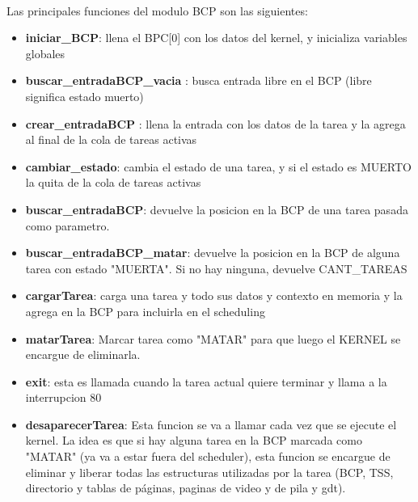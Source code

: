 \documentclass[11pt, a4paper]{article}
\begin{document}
			\paragraph{}
				Las principales funciones del modulo BCP son las siguientes:
				
				\begin{itemize}
	
                  
                  \item \textbf{iniciar\_BCP}: llena el BPC[0] con los datos del kernel, y inicializa variables globales

          
                  \item \textbf{buscar\_entradaBCP\_vacia }: busca entrada libre en el BCP (libre significa estado muerto)
                 
                  \item \textbf{crear\_entradaBCP }: llena la entrada con los datos de la tarea y la agrega al final de la cola de tareas activas
   
                  \item \textbf{cambiar\_estado}: cambia el estado de una tarea, y si el estado es MUERTO la quita de la cola de tareas activas
   
                  \item \textbf{buscar\_entradaBCP}: devuelve la posicion en la BCP de una tarea pasada como parametro.
     
                  \item \textbf{buscar\_entradaBCP\_matar}: devuelve la posicion en la BCP de alguna tarea con estado "MUERTA". Si no hay ninguna, devuelve CANT\_TAREAS

                  
                  \item \textbf{cargarTarea}: carga una tarea y todo sus datos y contexto en memoria y la agrega en la BCP para incluirla en el scheduling

                  
                  \item \textbf{matarTarea}: Marcar tarea como "MATAR" para que luego el KERNEL se encargue de eliminarla. 
                                   
                  \item \textbf{exit}:  esta es llamada cuando la tarea actual quiere terminar y llama a la interrupcion 80

                  
                  \item \textbf{desaparecerTarea}: Esta funcion se va a llamar cada vez que se ejecute el kernel. La idea es que si hay alguna tarea en la BCP marcada como "MATAR" (ya va a estar fuera del scheduler), esta funcion se encargue de eliminar y liberar todas las estructuras utilizadas por la tarea (BCP, TSS, directorio y tablas de páginas, paginas de video y de pila y gdt).

                  	
		
				\end{itemize}
\end{document}

